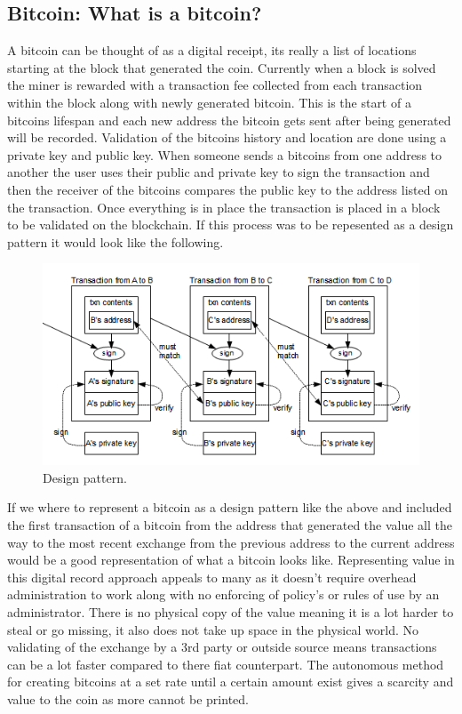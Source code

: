 \subsection{Bitcoin: What is a bitcoin?}
A bitcoin can be thought of as a digital receipt, its really a list of locations starting at the block that generated the coin. Currently when a block is solved the miner is rewarded with a transaction fee collected from each transaction within the block along with newly generated bitcoin. This is the start of a bitcoins lifespan and each new address the bitcoin gets sent after being generated will be recorded. Validation of the bitcoins history and location are done using a private key and public key. When someone sends a bitcoins from one address to another the user uses their public and private key to sign the transaction and then the receiver of the bitcoins compares the public key to the address listed on the transaction. Once everything is in place the transaction is placed in a block to be validated on the blockchain. If this process was to be repesented as a design pattern it would look like the following.

\begin{figure}[H]
\centering
\includegraphics[scale=0.55]{img/bitcoindesign.png}
\caption{Design pattern.}
\end{figure}

If we where to represent a bitcoin as a design pattern like the above and included the first transaction of a bitcoin from the address that generated the value all the way to the most recent exchange from the previous address to the current address would be a good representation of what a bitcoin looks like. Representing value in this digital record approach appeals to many as it doesn't require overhead administration  to work along with no enforcing of policy's or rules of use by an administrator. There is no physical copy of the value meaning it is a lot harder to steal or go missing, it also does not take up space in the physical world. No validating of the exchange by a 3rd party or outside source means transactions can be a lot faster compared to there fiat counterpart. The autonomous method for creating bitcoins at a set rate until a certain amount exist gives a scarcity and value to the coin as more cannot be printed.

